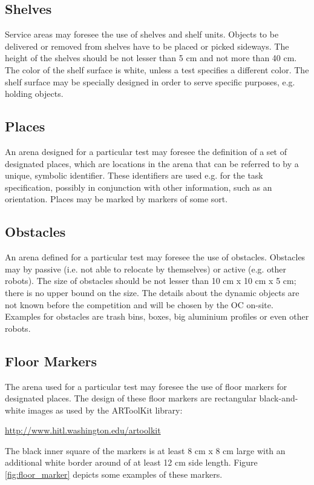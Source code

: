 \subsection{Shelves}
Service areas may foresee the use of shelves and shelf units. Objects to be delivered or removed from shelves have to be placed or picked sideways. The height of the shelves should be not lesser than 5 cm and not more than 40 cm. The color of the shelf surface is white, unless a test specifies a different color. The shelf surface may be specially designed in order to serve specific purposes, e.g. holding objects.

\subsection{Places}
An arena designed for a particular test may foresee the definition of a set of designated places, which are locations in the arena that can be referred to by a unique, symbolic identifier. These identifiers are used e.g. for the task specification, possibly in conjunction with other information, such as an orientation. Places may be marked by markers of some sort.

\subsection{Obstacles}
An arena defined for a particular test may foresee the use of obstacles. Obstacles may by passive (i.e. not able to relocate by themselves) or active (e.g. other robots). The size of obstacles should be not lesser than 10 cm x 10 cm x 5 cm; there is no upper bound on the size. The details about the dynamic objects are not known before the competition and will be chosen by the OC on-site. Examples for obstacles are trash bins, boxes, big aluminium profiles or even other robots.

\subsection{Floor Markers}
The arena used for a particular test may foresee the use of floor markers for designated places. The design of these floor markers are rectangular black-and-white images as used by the ARToolKit library:

\url{http://www.hitl.washington.edu/artoolkit}

The black inner square of the markers is at least 8 cm x 8 cm large with an additional white border around of at least 12 cm side length. Figure \ref{fig:floor_marker} depicts some examples of these markers.

